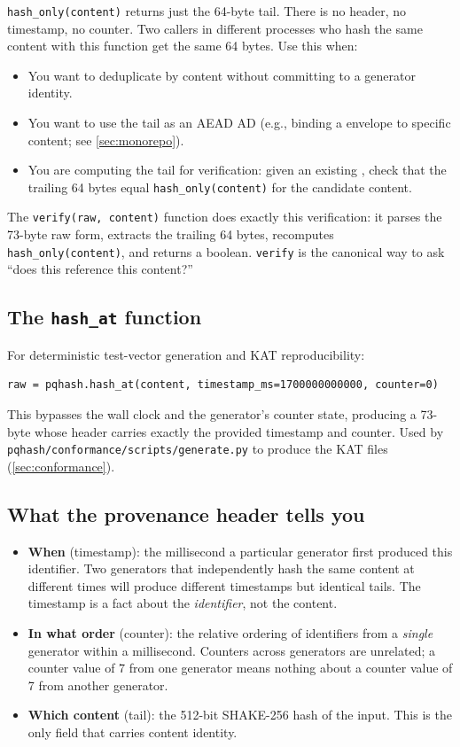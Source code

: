 \texttt{hash\_only(content)} returns just the 64-byte tail. There is no header, no timestamp, no counter. Two callers in different processes who hash the same content with this function get the same 64 bytes. Use this when:
\begin{itemize}
\item You want to deduplicate by content without committing to a generator identity.
\item You want to use the tail as an AEAD AD (e.g., binding a \pqcrypt{} envelope to specific content; see \cref{sec:monorepo}).
\item You are computing the tail for verification: given an existing \pqhash{}, check that the trailing 64 bytes equal \texttt{hash\_only(content)} for the candidate content.
\end{itemize}

The \texttt{verify(raw, content)} function does exactly this verification: it parses the 73-byte raw form, extracts the trailing 64 bytes, recomputes \texttt{hash\_only(content)}, and returns a boolean. \texttt{verify} is the canonical way to ask ``does this \pqhash{} reference this content?''

\subsection{The \texttt{hash\_at} function}

For deterministic test-vector generation and KAT reproducibility:

\begin{lstlisting}[language=Pseudocode]
raw = pqhash.hash_at(content, timestamp_ms=1700000000000, counter=0)
\end{lstlisting}

This bypasses the wall clock and the generator's counter state, producing a 73-byte \pqhash{} whose header carries exactly the provided timestamp and counter. Used by \texttt{pqhash/conformance/scripts/generate.py} to produce the KAT files (\cref{sec:conformance}).

\subsection{What the provenance header tells you}

\begin{itemize}
\item \textbf{When} (timestamp): the millisecond a particular generator first produced this identifier. Two generators that independently hash the same content at different times will produce different timestamps but identical tails. The timestamp is a fact about the \emph{identifier}, not the content.
\item \textbf{In what order} (counter): the relative ordering of identifiers from a \emph{single} generator within a millisecond. Counters across generators are unrelated; a counter value of 7 from one generator means nothing about a counter value of 7 from another generator.
\item \textbf{Which content} (tail): the 512-bit SHAKE-256 hash of the input. This is the only field that carries content identity.
\end{itemize}

